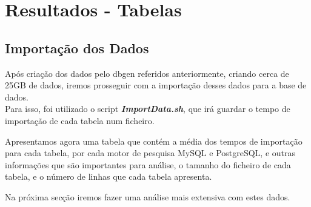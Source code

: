 \documentclass{article}
\begin{document}
\clearpage

\section{Resultados - Tabelas}

\subsection{Importação dos Dados}
\texttt{}\par Após criação dos dados pelo dbgen referidos anteriormente, criando cerca de 25GB de dados, iremos prosseguir com a importação desses dados para a base de dados. \\
Para isso, foi utilizado o script \textbf{\textit{ImportData.sh}}, que irá guardar o tempo de importação de cada tabela num ficheiro. \\
\texttt{}\par Apresentamos agora uma tabela que contém a média dos tempos de importação para cada tabela, por cada motor de pesquisa MySQL e PostgreSQL, e outras informações que são importantes para análise, o tamanho do ficheiro de cada tabela, e o número de linhas que cada tabela apresenta.
\texttt{}\par Na próxima secção iremos fazer uma análise mais extensiva com estes dados.\\
\begin{table}[H]
    \centering
    \renewcommand{\arraystretch}{1.7}
    \caption{Tempo de importação com 25GB de base de dados. Informações acerca de cada tabela.}
    \label{tab:table}
  \end{table}
\end{document}
